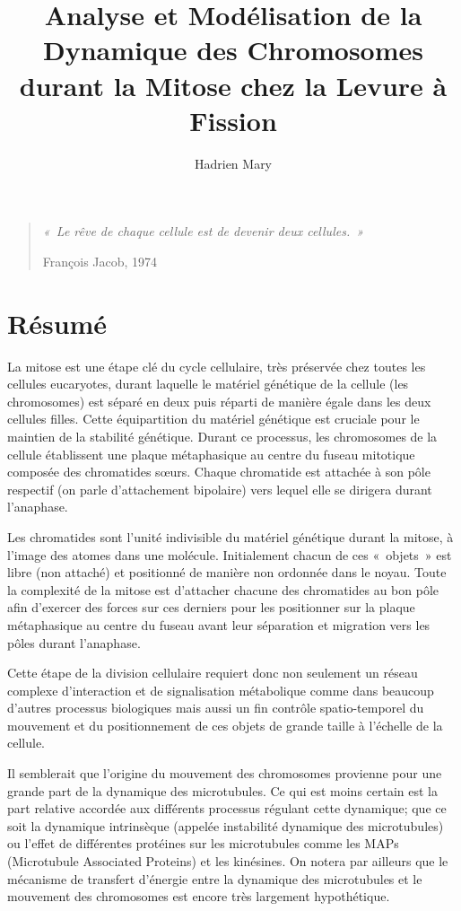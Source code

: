 \documentclass[12pt,a4paper,twoside,openright]{book}
\date{}
\title{Analyse et Modélisation de la Dynamique des Chromosomes durant la Mitose chez la Levure à Fission}
\author{Hadrien Mary}
\begin{document}
\makeflyleaf

\newpage

\pagestyle{empty}

\vspace*{\fill}

\begin{quote}
    {\centerline {\itshape «\ Le rêve de chaque cellule est de devenir deux cellules.\ »}}
    \centerline{François Jacob, 1974}
  \end{quote}\vspace*{\fill}

\newpage

\cleardoublepage
\clearpage\null

\section*{Résumé}

La mitose est une étape clé du cycle cellulaire, très préservée chez
toutes les cellules eucaryotes, durant laquelle le matériel génétique de
la cellule (les chromosomes) est séparé en deux puis réparti de manière
égale dans les deux cellules filles. Cette équipartition du matériel
génétique est cruciale pour le maintien de la stabilité génétique.
Durant ce processus, les chromosomes de la cellule établissent une
plaque métaphasique au centre du fuseau mitotique composée des
chromatides sœurs. Chaque chromatide est attachée à son pôle respectif
(on parle d'attachement bipolaire) vers lequel elle se dirigera durant
l'anaphase.

Les chromatides sont l'unité indivisible du matériel génétique durant la
mitose, à l'image des atomes dans une molécule. Initialement chacun de
ces «~objets~» est libre (non attaché) et positionné de manière non
ordonnée dans le noyau. Toute la complexité de la mitose est d'attacher
chacune des chromatides au bon pôle afin d'exercer des forces sur ces
derniers pour les positionner sur la plaque métaphasique au centre du
fuseau avant leur séparation et migration vers les pôles durant
l'anaphase.

Cette étape de la division cellulaire requiert donc non seulement un
réseau complexe d'interaction et de signalisation métabolique comme dans
beaucoup d'autres processus biologiques mais aussi un fin contrôle
spatio-temporel du mouvement et du positionnement de ces objets de
grande taille à l'échelle de la cellule.

Il semblerait que l'origine du mouvement des chromosomes provienne pour
une grande part de la dynamique des microtubules. Ce qui est moins
certain est la part relative accordée aux différents processus régulant
cette dynamique; que ce soit la dynamique intrinsèque (appelée
instabilité dynamique des microtubules) ou l'effet de différentes
protéines sur les microtubules comme les MAPs (Microtubule Associated
Proteins) et les kinésines. On notera par ailleurs que le mécanisme de
transfert d'énergie entre la dynamique des microtubules et le mouvement
des chromosomes est encore très largement hypothétique.
\end{document}
